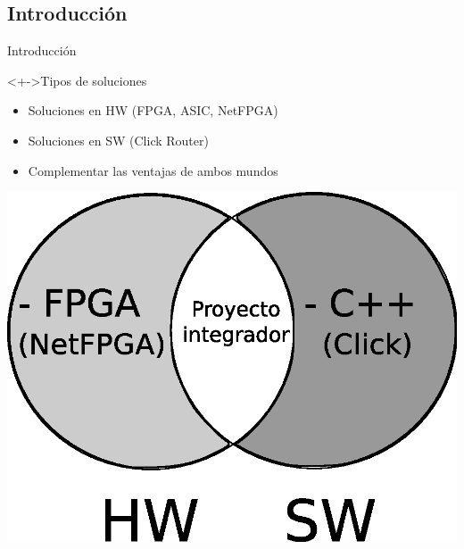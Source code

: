 \documentclass[xcolor=dvipsnames]{beamer}
\begin{document}
\subsection{Introducción}
\begin{frame}{Introducción}
\begin{block}<+->{Tipos de soluciones}  
    \begin{itemize}
      \scriptsize
     	\item Soluciones en HW (FPGA, ASIC, NetFPGA)
	\item Soluciones en SW (Click Router)
	\item Complementar las ventajas de ambos mundos 
    \end{itemize}
  \end{block}
  
\center 
\includegraphics[scale=0.4]{figures/interseccion.eps}
  
\end{frame}
  
\end{document}
